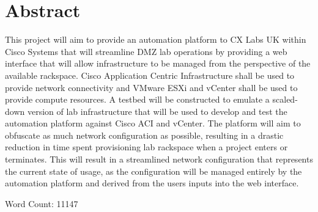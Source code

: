 \section*{Abstract}
This project will aim to provide an automation platform to CX Labs UK within Cisco Systems that will streamline DMZ lab operations by providing a web interface that will allow infrastructure to be managed from the perspective of the available rackspace. Cisco Application Centric Infrastructure shall be used to provide network connectivity and VMware ESXi and vCenter shall be used to provide compute resources. A testbed will be constructed to emulate a scaled-down version of lab infrastructure that will be used to develop and test the automation platform against Cisco ACI and vCenter. The platform will aim to obfuscate as much network configuration as possible, resulting in a drastic reduction in time spent provisioning lab rackspace when a project enters or terminates. This will result in a streamlined network configuration that represents the current state of usage, as the configuration will be managed entirely by the automation platform and derived from the users inputs into the web interface.



Word Count: 11147